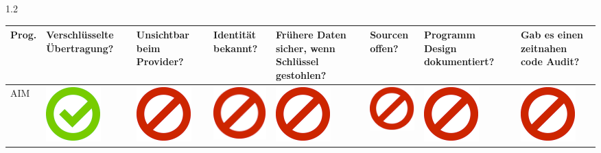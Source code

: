 \documentclass[final]{beamer}
\newlength{\twocolwid}
\begin{document}
\begin{frame}[t]
\begin{columns}[t, totalwidth=\textwidth]
\begin{column}{1.2\twocolwid}
\begin{tabular}{ L{8cm} | C{4.5cm} | C{4.5cm} | C{4.5cm} | C{4.5cm} | C{4.5cm} | C{5cm} | C{4.5cm} | }
Prog. & Ver\-schlüs\-sel\-te Über\-tra\-gung? & Un\-sicht\-bar beim Pro\-vider? & Iden\-tität be\-kannt? & Frühere Daten sicher, wenn Schlüssel ge\-stohlen? & Sourcen offen? & Programm Design dokumentiert? & Gab es einen zeitnahen code Audit? \tabularnewline
\hline
AIM & \includegraphics[scale=0.5]{pics/haken.png} & \includegraphics[scale=0.5]{pics/nohaken.png} & \includegraphics[scale=0.5]{pics/nohaken.png} & \includegraphics[scale=0.5]{pics/nohaken.png} & \includegraphics[scale=0.5]{pics/nohaken.png} & \includegraphics[scale=0.5]{pics/nohaken.png} & \includegraphics[scale=0.5]{pics/nohaken.png} \tabularnewline[0.5ex]

\end{tabular}
\end{column}
\end{columns}
\end{frame}
\end{document}
